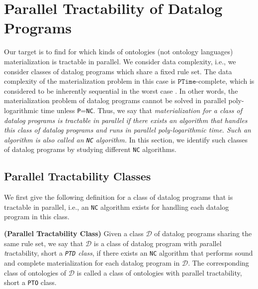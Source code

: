 \section{Parallel Tractability of Datalog Programs}
\label{sec:ptclass}

Our target is to find for which kinds of ontologies (not ontology languages)
materialization is tractable in parallel. We consider data complexity,
i.e., we consider classes of datalog programs which share a fixed rule set.
The data complexity of the materialization problem in this case is
$\texttt{PTime}$-complete, which is considered to be inherently sequential in the worst
case \cite{Raymond95}.
In other words, the materialization problem of
datalog programs cannot be solved in parallel poly-logarithmic time unless \texttt{P}=\texttt{NC}.
Thus, we say that \emph{materialization for a class of datalog programs is tractable in parallel
if there exists an algorithm that handles this class of datalog programs and runs in parallel
poly-logarithmic time. Such an algorithm is also called an \texttt{NC} algorithm.}
In this section, we identify such classes of datalog programs by studying different \texttt{NC} algorithms.


\subsection{Parallel Tractability Classes}

We first give the following definition for a class of datalog programs
that is tractable in parallel, i.e., an \texttt{NC} algorithm exists for handling each datalog program in this class.

\begin{definition}\label{def:ptd}
\textbf{(Parallel Tractability Class)} Given a class $\mathcal{D}$ of
datalog programs sharing the same rule set, we say that $\mathcal{D}$
is a class of datalog program with \emph{p}arallel
\emph{t}ractability, short a \emph{\texttt{PTD} class},
if there exists an \texttt{NC} algorithm that performs sound and complete materialization for each datalog program
in $\mathcal{D}$. The corresponding class of ontologies of $\mathcal{D}$ is called a
class of ontologies with parallel tractability, short a \texttt{PTO} class.
\end{definition}

